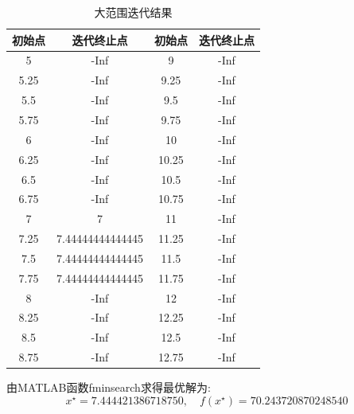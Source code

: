 \begin{table}[htbp]
  \centering
  \caption{大范围迭代结果}
    \begin{tabular}{|c|c|c|c|}
    \hline
    初始点   & 迭代终止点 & 初始点   & 迭代终止点 \\
    \hline
    5     & -Inf  & 9     & -Inf \\
    \hline
    5.25  & -Inf  & 9.25  & -Inf \\
    \hline
    5.5   & -Inf  & 9.5   & -Inf \\
    \hline
    5.75  & -Inf  & 9.75  & -Inf \\
    \hline
    6     & -Inf  & 10    & -Inf \\
    \hline
    6.25  & -Inf  & 10.25 & -Inf \\
    \hline
    6.5   & -Inf  & 10.5  & -Inf \\
    \hline
    6.75  & -Inf  & 10.75 & -Inf \\
    \hline
    7     & 7     & 11    & -Inf \\
    \hline
    7.25  & 7.44444444444445 & 11.25 & -Inf \\
    \hline
    7.5   & 7.44444444444445 & 11.5  & -Inf \\
    \hline
    7.75  & 7.44444444444445 & 11.75 & -Inf \\
    \hline
    8     & -Inf  & 12    & -Inf \\
    \hline
    8.25  & -Inf  & 12.25 & -Inf \\
    \hline
    8.5   & -Inf  & 12.5  & -Inf \\
    \hline
    8.75  & -Inf  & 12.75 & -Inf \\
    \hline
    \end{tabular}%
  \label{tab:addlabel}%
\end{table}%


由MATLAB函数fminsearch求得最优解为:\[x^{\star}=7.444421386718750,\quad f(x^{\star})=70.243720870248540\]

